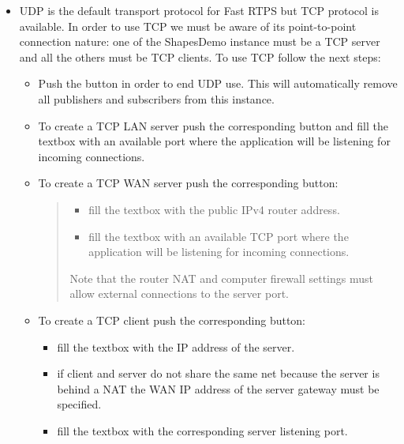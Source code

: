 \documentclass[letterpaper,10pt,english]{sphinxmanual}
\begin{document}
\begin{itemize}
\item {} 
 UDP is the default transport protocol for Fast RTPS but TCP protocol is available. In order to use TCP we must be aware of its point-to-point connection nature: one of the ShapesDemo instance must be a TCP server and all the others must be TCP clients. To use TCP follow the next steps:
\begin{itemize}
\item {} 
Push the  button in order to end UDP use. This will automatically remove all publishers and subscribers from this instance.

\item {} 
To create a TCP LAN server push the corresponding button and fill the  textbox with an available port where the application will be listening for incoming connections.

\item {} 
To create a TCP WAN server push the corresponding button:
\begin{quote}
\begin{itemize}
\item {} 
fill the  textbox with the public IPv4 router address.

\item {} 
fill the  textbox with an available TCP port where the application will be listening for incoming connections.

\end{itemize}

Note that the router NAT and computer firewall settings must allow external connections to the server port.
\end{quote}

\item {} 
To create a TCP client push the corresponding button:
\begin{itemize}
\item {} 
fill the  textbox with the IP address of the server.

\item {} 
if client and server do not share the same net because the server is behind a NAT the WAN IP address of the server gateway must be specified.

\item {} 
fill the  textbox with the corresponding server listening port.


\end{itemize}
\end{itemize}
\end{itemize}
\end{document}
